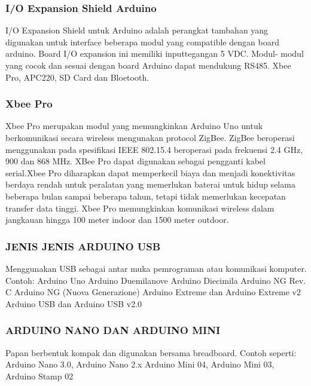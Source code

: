 \subsubsection  {I/O Expansion Shield Arduino}
I/O Expansion Shield untuk Arduino adalah perangkat tambahan yang digunakan untuk interface beberapa modul yang compatible dengan board arduino. Board I/O expansion ini memiliki inputtegangan 5 VDC. Modul- modul yang cocok dan sesuai dengan board Arduino dapat mendukung RS485. Xbee Pro, APC220, SD Card dan Bloetooth.

\subsubsection {Xbee Pro}
 Xbee Pro merupakan modul yang memungkinkan Arduino Uno untuk berkomunikasi secara wireless
mengunakan protocol ZigBee. ZigBee beroperasi menggunakan pada spesifikasi IEEE 802.15.4 beroperasi pada frekuensi
2.4 GHz, 900 dan 868 MHz. XBee Pro dapat digunakan sebagai pengganti kabel serial.Xbee Pro diharapkan dapat memperkecil biaya dan menjadi
konektivitas berdaya rendah untuk peralatan yang memerlukan baterai untuk hidup selama beberapa bulan sampai beberapa tahun, tetapi tidak memerlukan kecepatan transfer data tinggi. Xbee Pro memungkinkan komunikasi wireless dalam jangkauan hingga 100 meter indoor dan 1500 meter outdoor.


\subsubsection {JENIS JENIS ARDUINO USB}
Menggunakan USB sebagai antar muka pemrograman atau komunikasi komputer. Contoh:
Arduino Uno
Arduino Duemilanove
Arduino Diecimila
Arduino NG Rev. C
Arduino NG (Nuova Generazione)
Arduino Extreme dan Arduino Extreme v2
Arduino USB dan Arduino USB v2.0 

\subsubsection {ARDUINO NANO DAN ARDUINO MINI}
Papan berbentuk kompak dan digunakan bersama breadboard. Contoh seperti:
Arduino Nano 3.0, Arduino Nano 2.x
Arduino Mini 04, Arduino Mini 03, Arduino Stamp 02